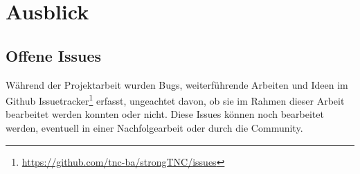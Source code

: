 \chapter{Ausblick}

\section{Offene Issues} 

Während der Projektarbeit wurden Bugs, weiterführende Arbeiten und Ideen im
Github Issuetracker\footnote{\url{https://github.com/tnc-ba/strongTNC/issues}}
erfasst, ungeachtet davon, ob sie im Rahmen dieser Arbeit bearbeitet werden
konnten oder nicht.  Diese Issues können noch bearbeitet werden, eventuell in
einer Nachfolgearbeit oder durch die Community.



